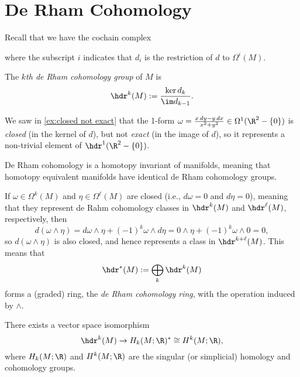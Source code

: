 
\section{De Rham Cohomology}
\label{sec:de Rham}

Recall that we have the cochain complex
	\begin{center}
	\end{center}
where the subscript $i$ indicates that $d_i$ is the restriction of $d$ to $\Omega^i(M)$.

\begin{definition}\label{def:de Rham cohomology}
	The \emph{$k$th de Rham cohomology group} of $M$ is
	\[
		\hdr^k(M) := \frac{\ker d_k}{\im d_{k-1}}.
	\]
\end{definition}

\begin{example}\label{ex:closed not exact 2}
	We saw in \cref{ex:closed not exact} that the 1-form $\omega = \frac{x\, dy - y\, dx}{x^2 + y^2} \in \Omega^1(\R^2 -\{0\})$ is \emph{closed} (in the kernel of $d$), but not \emph{exact} (in the image of $d$), so it represents a non-trivial element of $\hdr^1(\R^2 - \{0\})$.
\end{example}

De Rham cohomology is a homotopy invariant of manifolds, meaning that homotopy equivalent manifolds have identical de Rham cohomology groups. 

If $\omega \in \Omega^k(M)$ and $\eta \in \Omega^\ell(M)$ are closed (i.e., $d \omega = 0$ and $d\eta = 0$), meaning that they represent de Rahm cohomology classes in $\hdr^k(M)$ and  $\hdr^\ell(M)$, respectively, then
\[
	d(\omega \wedge \eta) = d\omega \wedge \eta + (-1)^k \omega \wedge d\eta = 0 \wedge \eta + (-1)^k \omega \wedge 0 = 0,
\]
so $d(\omega \wedge \eta)$ is also closed, and hence represents a class in $\hdr^{k+\ell}(M)$. This means that
\[
	\hdr^\ast(M) := \bigoplus_k \hdr^k(M)
\]
forms a (graded) ring, the \emph{de Rham cohomology ring}, with the operation induced by $\wedge$.

\begin{theorem}\label{thm:de Rham}
	There exists a vector space isomorphism
	\[
		\hdr^k(M) \to H_k(M;\R)^\ast \cong H^k(M;\R),
	\]
	where $H_k(M;\R)$ and $H^k(M;\R)$ are the singular (or simplicial) homology and cohomology groups.
\end{theorem}


